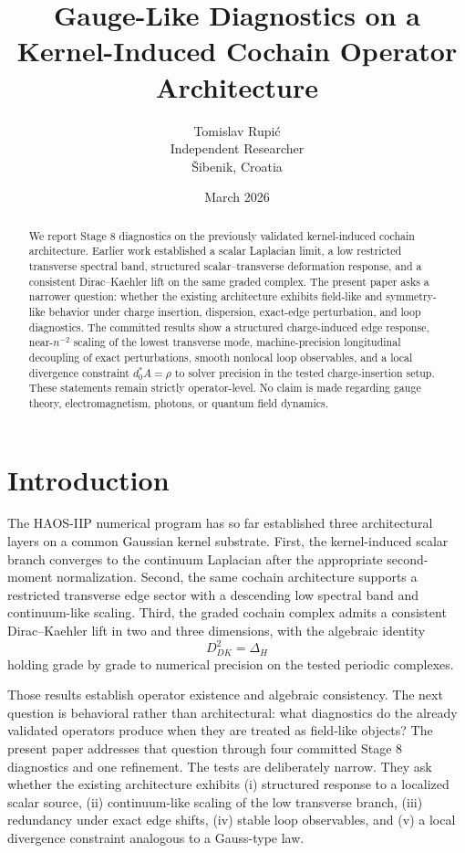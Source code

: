 \documentclass[11pt]{article}
\title{Gauge-Like Diagnostics on a Kernel-Induced Cochain Operator Architecture}
\author{Tomislav Rupi\'c\\Independent Researcher\\\v{S}ibenik, Croatia}
\date{March 2026}
\begin{document}
\maketitle

\begin{abstract}
We report Stage 8 diagnostics on the previously validated kernel-induced cochain architecture. Earlier work established a scalar Laplacian limit, a low restricted transverse spectral band, structured scalar--transverse deformation response, and a consistent Dirac--Kaehler lift on the same graded complex. The present paper asks a narrower question: whether the existing architecture exhibits field-like and symmetry-like behavior under charge insertion, dispersion, exact-edge perturbation, and loop diagnostics. The committed results show a structured charge-induced edge response, near-$n^{-2}$ scaling of the lowest transverse mode, machine-precision longitudinal decoupling of exact perturbations, smooth nonlocal loop observables, and a local divergence constraint $d_0^{*}A = \rho$ to solver precision in the tested charge-insertion setup. These statements remain strictly operator-level. No claim is made regarding gauge theory, electromagnetism, photons, or quantum field dynamics.
\end{abstract}

\section{Introduction}
The HAOS-IIP numerical program has so far established three architectural layers on a common Gaussian kernel substrate. First, the kernel-induced scalar branch converges to the continuum Laplacian after the appropriate second-moment normalization. Second, the same cochain architecture supports a restricted transverse edge sector with a descending low spectral band and continuum-like scaling. Third, the graded cochain complex admits a consistent Dirac--Kaehler lift in two and three dimensions, with the algebraic identity
\begin{equation}
D_{DK}^2 = \Delta_H
\end{equation}
holding grade by grade to numerical precision on the tested periodic complexes.

Those results establish operator existence and algebraic consistency. The next question is behavioral rather than architectural: what diagnostics do the already validated operators produce when they are treated as field-like objects? The present paper addresses that question through four committed Stage 8 diagnostics and one refinement. The tests are deliberately narrow. They ask whether the existing architecture exhibits (i) structured response to a localized scalar source, (ii) continuum-like scaling of the low transverse branch, (iii) redundancy under exact edge shifts, (iv) stable loop observables, and (v) a local divergence constraint analogous to a Gauss-type law.
\end{document}
